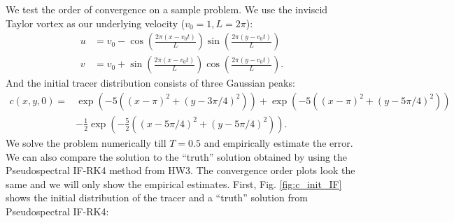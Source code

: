 \documentclass[11pt,letterpaper]{article}
\begin{document}
We test the order of convergence on a sample problem. We use the inviscid Taylor vortex as our underlying velocity ($v_0 = 1, L = 2\pi$):
\begin{align}
    u &= v_0-\cos\left(\frac{2\pi(x-v_0t)}{L}\right)\sin\left(\frac{2\pi(y-v_0t)}{L}\right)\nonumber\\
    v &= v_0+\sin\left(\frac{2\pi(x-v_0t)}{L}\right)\cos\left(\frac{2\pi(y-v_0t)}{L}\right).\label{eq:taylor}
\end{align}
And the initial tracer distribution consists of three Gaussian peaks:
\begin{align}
    c(x,y,0) =& \exp\left( -5\left((x-\pi)^2+(y-3\pi/4)^2\right) \right)+\exp\left( -5\left((x-\pi)^2+(y-5\pi/4)^2\right) \right)\nonumber\\
    &-\frac{1}{2}\exp\left( -\frac{5}{2}\left((x-5\pi/4)^2+(y-5\pi/4)^2\right) \right).\label{eq:3Gauss}
\end{align}
We solve the problem numerically till $T = 0.5$ and empirically estimate the error. We can also compare the solution to the ``truth'' solution obtained by using the Pseudospectral IF-RK4 method from HW3. The convergence order plots look the same and we will only show the empirical estimates. First, Fig. \ref{fig:c_init_IF} shows the initial distribution of the tracer and a ``truth'' solution from Pseudospectral IF-RK4:
\end{document}
